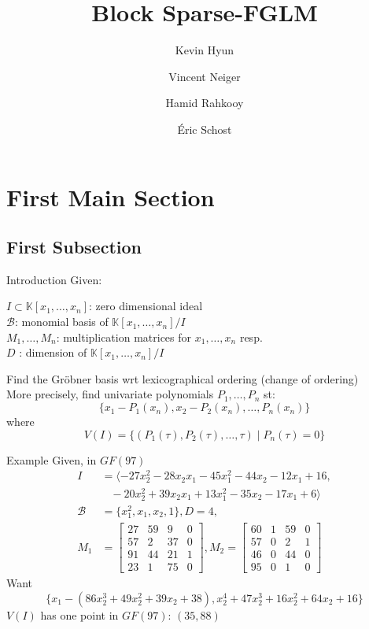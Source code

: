 \documentclass{beamer}
\title{Block Sparse-FGLM}
\author{Kevin Hyun \and Vincent Neiger \and Hamid Rahkooy \and \'Eric Schost}
\begin{document}
\begin{frame}
  \titlepage
\end{frame}


\section{First Main Section}

\subsection{First Subsection}

\begin{frame}{Introduction}
	Given:
	\begin{center}
		$I \subset \mathbb{K}[x_1,\dots,x_n]$: zero dimensional ideal\\
		$\mathcal{B}$: monomial basis of $\mathbb{K}[x_1,\dots,x_n]/I$\\
		$M_1,\dots,M_n$: multiplication matrices for $x_1,\dots,x_n$ resp.\\
		$D$ : dimension of $\mathbb{K}[x_1,\dots,x_n]/I$
	\end{center}
	Find the Gr\"obner basis wrt lexicographical ordering
	(change of ordering)\\
	\pause
	More precisely, find univariate polynomials $P_1,\dots, P_n$ st:
	$$ \{ x_1- P_1(x_n), x_2-P_2(x_n), \dots, P_n(x_n) \}$$
	where
	$$ V(I) = \{  (P_1(\tau), P_2(\tau), \dots, \tau) \mid P_n(\tau) = 0   \}$$
\end{frame}

\begin{frame}{Example}
	Given, in $GF(97)$
	\begin{align*}
	I &= \langle -27x_2^2 - 28x_2x_1 - 45x_1^2 - 44x_2 - 12x_1 + 16, \\
	&\;\;\; -20x_2^2 + 39x_2x_1 + 13x_1^2 - 35x_2 - 17x_1 + 6\rangle\\
	\mathcal{B} &= \{ x_1^2,x_1,x_2,1 \}, D = 4, \\
	M_1 &= \begin{bmatrix}
	27& 59&  9&  0\\
	57&  2& 37&  0\\
	91& 44& 21&  1\\
	23&  1& 75&  0
	\end{bmatrix},
	M_2 = \begin{bmatrix}
	60&  1& 59&  0\\
	57&  0&  2&  1\\
	46&  0& 44&  0\\
	95&  0&  1&  0
	\end{bmatrix}
	\end{align*}
	Want
	$$ \{
	x_1 -(86x_2^3 + 49x_2^2 + 39x_2 + 38) ,x_2^4 + 47x_2^3 + 16x_2^2 + 64x_2 + 16\}$$
	$V(I)$ has one point in $GF(97)$: $(35,88)$
\end{frame}
\end{document}
